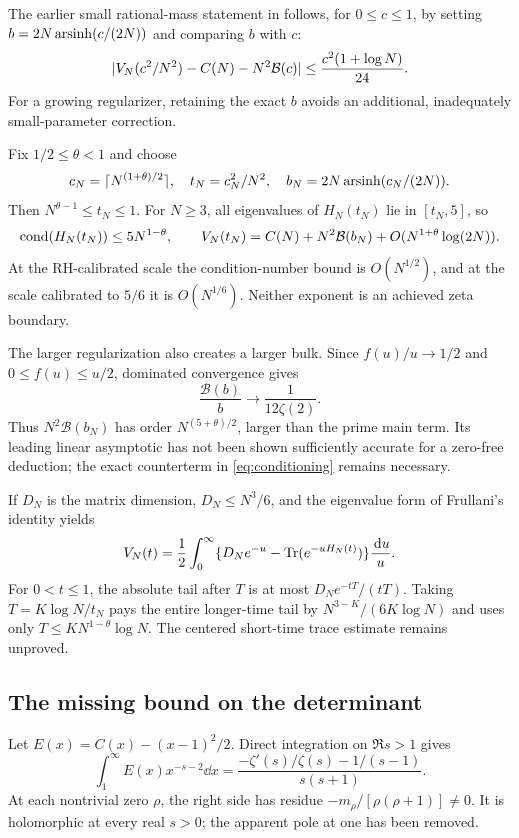 The earlier small rational-mass statement in \cite{R1000} follows, for $0\le c\le1$, by setting $b=2N\operatorname{arsinh}(c/(2N))$ and comparing $b$ with $c$:
\[
 \lvert V_N(c^2/N^2)-C(N)-N^2\mathcal B(c)\rvert
 \le\frac{c^2(1+\log N)}{24}.
\]
For a growing regularizer, retaining the exact $b$ avoids an additional, inadequately small-parameter correction.

Fix $1/2\le\theta<1$ and choose
\[
 c_N=\lceil N^{(1+\theta)/2}\rceil,\quad
 t_N=c_N^2/N^2,\quad b_N=2N\operatorname{arsinh}(c_N/(2N)).
\]
Then $N^{\theta-1}\le t_N\le1$. For $N\ge3$, all eigenvalues of $H_N(t_N)$ lie in $[t_N,5]$, so
\begin{equation}\label{eq:conditioning}
 \operatorname{cond}(H_N(t_N))\le5N^{1-\theta},\qquad
 V_N(t_N)=C(N)+N^2\mathcal B(b_N)+O(N^{1+\theta}\log(2N)).
\end{equation}
At the RH-calibrated scale the condition-number bound is $O(N^{1/2})$, and at the scale calibrated to $5/6$ it is $O(N^{1/6})$. Neither exponent is an achieved zeta boundary.

The larger regularization also creates a larger bulk. Since $f(u)/u\to1/2$ and $0\le f(u)\le u/2$, dominated convergence gives
\[
 \frac{\mathcal B(b)}b\longrightarrow\frac1{12\zeta(2)}.
\]
Thus $N^2\mathcal B(b_N)$ has order $N^{(5+\theta)/2}$, larger than the prime main term. Its leading linear asymptotic has not been shown sufficiently accurate for a zero-free deduction; the exact counterterm in \eqref{eq:conditioning} remains necessary.

If $D_N$ is the matrix dimension, $D_N\le N^3/6$, and the eigenvalue form of Frullani's identity yields
\[
 V_N(t)=\frac12\int_0^\infty
       \{D_Ne^{-u}-\operatorname{Tr}(e^{-uH_N(t)})\}\frac{\,\mathrm d u}{u}.
\]
For $0<t\le1$, the absolute tail after $T$ is at most $D_Ne^{-tT}/(tT)$. Taking $T=K\log N/t_N$ pays the entire longer-time tail by
$N^{3-K}/(6K\log N)$ and uses only $T\le K N^{1-\theta}\log N$. The centered short-time trace estimate remains unproved.

\subsection{The missing bound on the determinant}
Let $E(x)=C(x)-(x-1)^2/2$. Direct integration on $\Re s>1$ gives
\begin{equation}\label{eq:det-Mellin}
 \int_1^\infty E(x)x^{-s-2}\dd x
 =\frac{-\zeta'(s)/\zeta(s)-1/(s-1)}{s(s+1)}.
\end{equation}
At each nontrivial zero $\rho$, the right side has residue $-m_\rho/[\rho(\rho+1)]\ne0$. It is holomorphic at every real $s>0$; the apparent pole at one has been removed.

